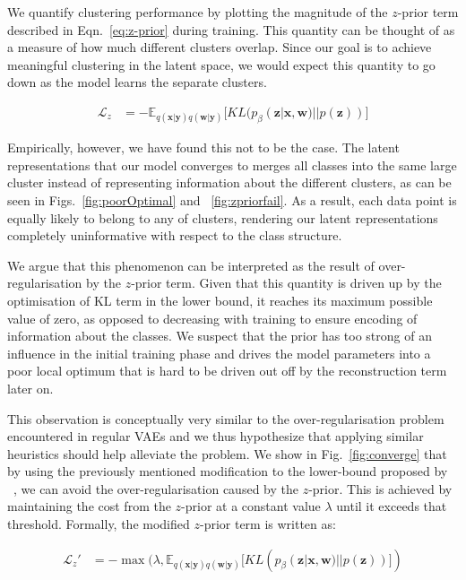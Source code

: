 \documentclass{article} \usepackage{iclr2017_conference,times}
\begin{document}
We quantify clustering performance by plotting the magnitude of the $z$-prior term described in Eqn.~\ref{eq:z-prior} during training. This quantity can be thought of as a measure of how much different clusters overlap. Since our goal is to achieve meaningful clustering in the latent space, we would expect this quantity to go down as the model learns the separate clusters.

\begin{equation}
\begin{aligned}
 \mathcal{L}_{z} &= -  \mathbb{E}_{q(\pmb{x}|\pmb{y})q(\pmb{w}|\pmb{y})}\big[ KL(p_{\beta}(\pmb{z}| \pmb{x},\pmb{w})|| p(\pmb{z})) \big]
  \label{eq:z-prior}\end{aligned}
\end{equation}

Empirically, however, we have found this not to be the case. The latent representations that our model converges to merges all classes into the same large cluster instead of representing information about the different clusters, as can be seen in Figs.~\ref{fig:poorOptimal} and ~\ref{fig:zpriorfail}. As a result, each data point is equally likely to belong to any of clusters, rendering our latent representations completely uninformative with respect to the class structure.

We argue that this phenomenon can be interpreted as the result of over-regularisation by the $z$-prior term. Given that this quantity is driven up by the optimisation of KL term in the lower bound, it reaches its maximum possible value of zero, as opposed to decreasing with training to ensure encoding of information about the classes. We suspect that the prior has too strong of an influence in the initial training phase and drives the model parameters into a poor local optimum that is hard to be driven out off by the reconstruction term later on.

This observation is conceptually very similar to the over-regularisation problem encountered in regular VAEs and we thus hypothesize that applying similar heuristics should help alleviate the problem. We show in Fig.~\ref{fig:converge} that by using the previously mentioned modification to the lower-bound proposed by ~\cite{kingma2016improving}, we can avoid the over-regularisation caused by the $z$-prior. This is achieved by maintaining the cost from the $z$-prior at a constant value $\lambda$ until it exceeds that threshold. Formally, the modified $z$-prior term is written as:

\begin{equation}
\begin{aligned}
 \mathcal{L}_{z}' &= - \max (\lambda,  \mathbb{E}_{q(\pmb{x}|\pmb{y})q(\pmb{w}|\pmb{y})}\big[ KL(p_{\beta}(\pmb{z}| \pmb{x},\pmb{w})|| p(\pmb{z})) \big])
  \label{eq:z-prior_after}\end{aligned}
\end{equation}
\end{document}
